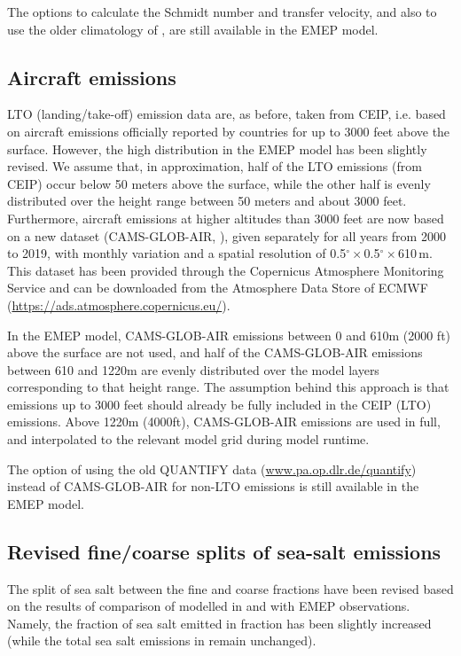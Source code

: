 The options to calculate the Schmidt number and transfer velocity, and also to use the older climatology of \citet{Kettle1999}, are still available in the EMEP model.

\subsection{Aircraft emissions}
\label{ssec:Aircraft}

 LTO (landing/take-off) emission data are, as before, taken from CEIP, i.e. based on aircraft emissions officially reported by countries for up to 3000 feet above the surface. However, the high distribution in the EMEP model has been slightly revised. We assume that, in approximation, half of the LTO emissions (from CEIP) occur below 50 meters above the surface, while the other half is evenly distributed over the height range between 50 meters and about 3000 feet.
 Furthermore, aircraft emissions at higher altitudes than 3000 feet are now based on a new dataset (CAMS-GLOB-AIR, \citealt{GranierCAMS2019}), given separately for all years from 2000 to 2019, with monthly variation and a spatial resolution of 0.5$^\circ$\,$\times$\,0.5$^\circ$\,$\times$\,610\,m. This dataset has been provided through the Copernicus Atmosphere Monitoring Service and can be downloaded from the Atmosphere Data Store of ECMWF (\url{https://ads.atmosphere.copernicus.eu/}).

In the EMEP model, CAMS-GLOB-AIR emissions between 0 and 610m (2000 ft) above the surface are not used, and half of the CAMS-GLOB-AIR emissions between 610 and 1220m are evenly distributed over the model layers corresponding to that height range. The assumption behind this approach is that emissions up to 3000 feet should already be fully included in the CEIP (LTO) emissions. Above 1220m (4000ft), CAMS-GLOB-AIR emissions are used in full, and interpolated to the relevant model grid during model runtime.

The option of using the old QUANTIFY data (\url{www.pa.op.dlr.de/quantify}) instead of CAMS-GLOB-AIR for non-LTO emissions is still available in the EMEP model.

\subsection{Revised fine/coarse splits of sea-salt emissions}
\label{ssec:updateSS}

The split of sea salt between the fine and coarse fractions have been revised based on the results of comparison of modelled  in \PM[2.5] and \PM[10] with EMEP observations. Namely, the fraction of sea salt emitted in \PM[2.5] fraction has been slightly increased (while the total sea salt emissions in \PM[10] remain unchanged). 

